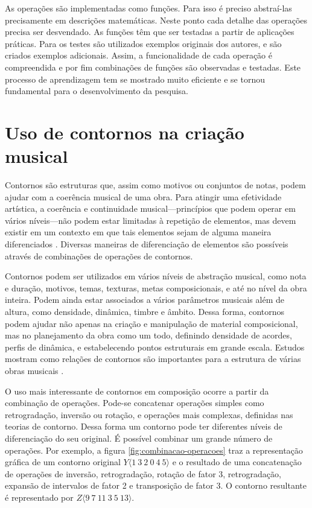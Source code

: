 As operações são implementadas como funções. Para isso é preciso
abstraí-las precisamente em descrições matemáticas. Neste ponto cada
detalhe das operações precisa ser desvendado. As funções têm que ser
testadas a partir de aplicações práticas. Para os testes são
utilizados exemplos originais dos autores, e são criados exemplos
adicionais. Assim, a funcionalidade de cada operação é compreendida e
por fim combinações de funções são observadas e testadas. Este
processo de aprendizagem tem se mostrado muito eficiente e se tornou
fundamental para o desenvolvimento da pesquisa.

\section{Uso de contornos na criação musical}
\label{sec:uso-de-contornos}

Contornos são estruturas que, assim como motivos ou conjuntos de
notas, podem ajudar com a coerência musical de uma obra. Para atingir
uma efetividade artística, a coerência e continuidade
musical---princípios que podem operar em vários níveis---não podem
estar limitadas à repetição de elementos, mas devem existir em um
contexto em que tais elementos sejam de alguma maneira diferenciados
\cite[p. 296]{kliewer75:aspects}. Diversas maneiras de diferenciação
de elementos são possíveis através de combinações de operações de
contornos.

Contornos podem ser utilizados em vários níveis de abstração musical,
como nota e duração, motivos, temas, texturas, metas composicionais, e
até no nível da obra inteira. Podem ainda estar associados a vários
parâmetros musicais além de altura, como densidade, dinâmica, timbre e
âmbito. Dessa forma, contornos podem ajudar não apenas na criação e
manipulação de material composicional, mas no planejamento da obra
como um todo, definindo densidade de acordes, perfis de dinâmica, e
estabelecendo pontos estruturais em grande escala. Estudos mostram
como relações de contornos são importantes para a estrutura de várias
obras musicais
\cite{friedmann85:methodology,clifford95:contour,beard03:contour}.

O uso mais interessante de contornos em composição ocorre a partir da
combinação de operações. Pode-se concatenar operações simples como
retrogradação, inversão ou rotação, e operações mais complexas,
definidas nas teorias de contorno. Dessa forma um contorno pode ter
diferentes níveis de diferenciação do seu original. É possível
combinar um grande número de operações. Por exemplo, a figura
\ref{fig:combinacao-operacoes} traz a representação gráfica de um
contorno original $Y\langle1\:3\:2\:0\:4\:5\rangle$ e o resultado de
uma concatenação de operações de inversão, retrogradação, rotação de
fator 3, retrogradação, expansão de intervalos de fator 2 e
transposição de fator 3. O contorno resultante é representado por
$Z\langle9\:7\:11\:3\:5\:13\rangle$.

